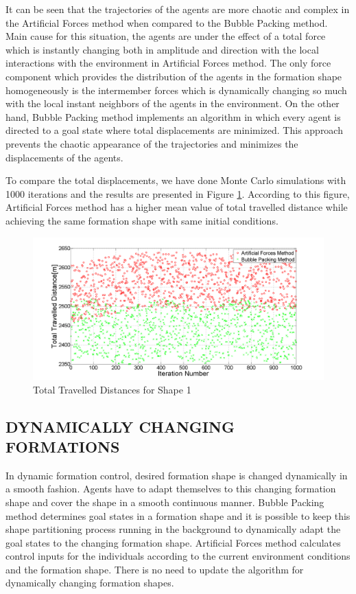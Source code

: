 \documentclass[letterpaper, 10 pt, conference]{ieeeconf}  %
\begin{document}
It can be seen that the trajectories of the agents are more chaotic and complex in the Artificial Forces method when compared to the Bubble Packing method. Main cause for this situation, the agents are under the effect of a total force which is instantly changing both in amplitude and direction with the local interactions with the environment in Artificial Forces method. The only force component which provides the distribution of the agents in the formation shape homogeneously is the intermember forces which is dynamically changing so much with the local instant neighbors of the agents in the environment. On the other hand, Bubble Packing method implements an algorithm in which every agent is directed to a goal state where total displacements are minimized. This approach prevents the chaotic appearance of the trajectories and minimizes the displacements of the agents.

To compare the total displacements, we have done Monte Carlo simulations with 1000 iterations and the results are presented in Figure \ref{total_disp_1}. According to this figure, Artificial Forces method has a higher mean value of total travelled distance while achieving the same formation shape with same initial conditions.
		
\begin{figure}[thpb]
\caption{Total Travelled Distances for Shape 1} \label{total_disp_1}
\centerline{\includegraphics[scale = 0.18]{Total_Energy_Shape_1}}
\end{figure}

\subsection{DYNAMICALLY CHANGING FORMATIONS} \label{dynamical_ref}
In dynamic formation control, desired formation shape is changed dynamically in a smooth fashion. Agents have to adapt themselves to this changing formation shape and cover the shape in a smooth continuous manner. Bubble Packing method determines goal states in a formation shape and it is possible to keep this shape partitioning process running in the background to dynamically adapt the goal states to the changing formation shape. Artificial Forces method calculates control inputs for the individuals according to the current environment conditions and the formation shape. There is no need to update the algorithm for dynamically changing formation shapes.
\end{document}
